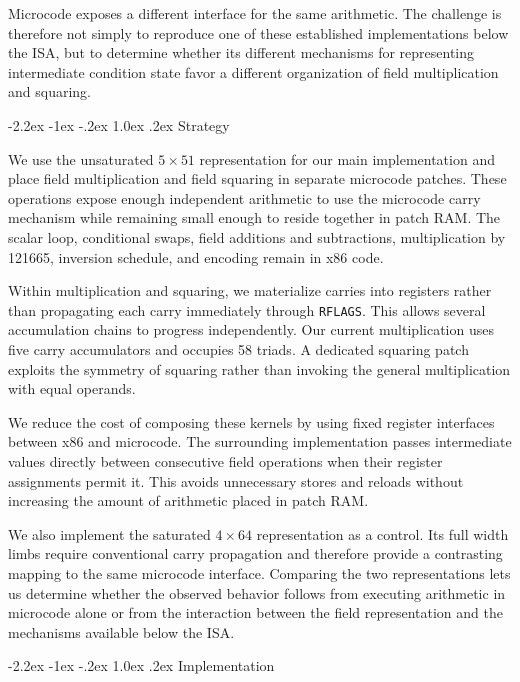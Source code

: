 \documentclass[journal=tches,submission]{iacrtrans}
\makeatletter
\newcommand{\code}[1]{\texttt{#1}}
\renewcommand\subsection{\@startsection{subsection}{2}{\z@}%
      {-2.2ex \@plus -1ex \@minus -.2ex}%
      {1.0ex \@plus .2ex}%
      {\normalfont\large\bfseries\SS@subsectfont}}
\makeatother
\begin{document}
Microcode exposes a different interface for the same arithmetic.
The challenge is therefore not simply to reproduce one of these established implementations below the ISA, but to determine whether its different mechanisms for representing intermediate condition state favor a different organization of field multiplication and squaring.

\subsection{Strategy}
\label{sec:c-strategy}

We use the unsaturated $5\times51$ representation for our main implementation and place field multiplication and field squaring in separate microcode patches.
These operations expose enough independent arithmetic to use the microcode carry mechanism while remaining small enough to reside together in patch RAM.
The scalar loop, conditional swaps, field additions and subtractions, multiplication by 121665, inversion schedule, and encoding remain in x86 code.

Within multiplication and squaring, we materialize carries into registers rather than propagating each carry immediately through \code{RFLAGS}.
This allows several accumulation chains to progress independently.
Our current multiplication uses five carry accumulators and occupies 58 triads.
A dedicated squaring patch exploits the symmetry of squaring rather than invoking the general multiplication with equal operands.

We reduce the cost of composing these kernels by using fixed register interfaces between x86 and microcode.
The surrounding implementation passes intermediate values directly between consecutive field operations when their register assignments permit it.
This avoids unnecessary stores and reloads without increasing the amount of arithmetic placed in patch RAM.

We also implement the saturated $4\times64$ representation as a control.
Its full width limbs require conventional carry propagation and therefore provide a contrasting mapping to the same microcode interface.
Comparing the two representations lets us determine whether the observed behavior follows from executing arithmetic in microcode alone or from the interaction between the field representation and the mechanisms available below the ISA.

\subsection{Implementation}
\label{sec}
\end{document}
